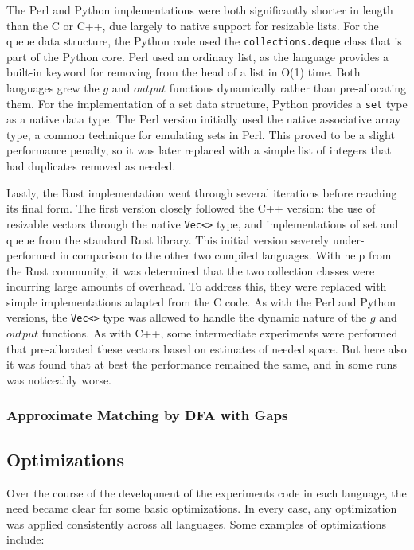 The Perl and Python implementations were both significantly shorter in length than the C or C++, due largely to native support for resizable lists. For the queue data structure, the Python code used the \texttt{collections.deque} class that is part of the Python core. Perl used an ordinary list, as the language provides a built-in keyword for removing from the head of a list in O(1) time. Both languages grew the $g$ and $output$ functions dynamically rather than pre-allocating them. For the implementation of a set data structure, Python provides a \texttt{set} type as a native data type. The Perl version initially used the native associative array type, a common technique for emulating sets in Perl. This proved to be a slight performance penalty, so it was later replaced with a simple list of integers that had duplicates removed as needed.

Lastly, the Rust implementation went through several iterations before reaching its final form. The first version closely followed the C++ version: the use of resizable vectors through the native \texttt{Vec<>} type, and implementations of set and queue from the standard Rust library. This initial version severely under-performed in comparison to the other two compiled languages. With help from the Rust community, it was determined that the two collection classes were incurring large amounts of overhead. To address this, they were replaced with simple implementations adapted from the C code. As with the Perl and Python versions, the \texttt{Vec<>} type was allowed to handle the dynamic nature of the $g$ and $output$ functions. As with C++, some intermediate experiments were performed that pre-allocated these vectors based on estimates of needed space. But here also it was found that at best the performance remained the same, and in some runs was noticeably worse.

\subsubsection{Approximate Matching by DFA with Gaps}

\subsection{Optimizations}

Over the course of the development of the experiments code in each language, the need became clear for some basic optimizations. In every case, any optimization was applied consistently across all languages. Some examples of optimizations include:

